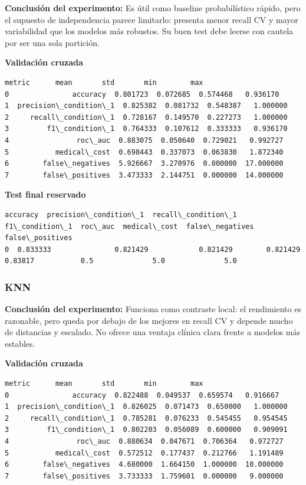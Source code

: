 \documentclass[11pt]{article}
\begin{document}
    
    \textbf{Conclusión del experimento:} Es útil como baseline
probabilístico rápido, pero el supuesto de independencia parece
limitarlo: presenta menor recall CV y mayor variabilidad que los modelos
más robustos. Su buen test debe leerse con cautela por ser una sola
partición.

    
    \textbf{Validación cruzada}

    
    
    \begin{Verbatim}[commandchars=\\\{\}]
                  metric      mean       std       min        max
0               accuracy  0.801723  0.072685  0.574468   0.936170
1  precision\_condition\_1  0.825382  0.081732  0.548387   1.000000
2     recall\_condition\_1  0.728167  0.149570  0.227273   1.000000
3         f1\_condition\_1  0.764333  0.107612  0.333333   0.936170
4                roc\_auc  0.883075  0.050640  0.729021   0.992727
5           medical\_cost  0.698443  0.337073  0.063830   1.872340
6        false\_negatives  5.926667  3.270976  0.000000  17.000000
7        false\_positives  3.473333  2.144751  0.000000  14.000000
    \end{Verbatim}

    
    \textbf{Test final reservado}

    
    
    \begin{Verbatim}[commandchars=\\\{\}]
   accuracy  precision\_condition\_1  recall\_condition\_1  f1\_condition\_1  roc\_auc  medical\_cost  false\_negatives  false\_positives
0  0.833333               0.821429            0.821429        0.821429  0.83817           0.5              5.0              5.0
    \end{Verbatim}

    
    \subsubsection{KNN}\label{knn}

    
    \textbf{Conclusión del experimento:} Funciona como contraste local: el
rendimiento es razonable, pero queda por debajo de los mejores en recall
CV y depende mucho de distancias y escalado. No ofrece una ventaja
clínica clara frente a modelos más estables.

    
    \textbf{Validación cruzada}

    
    
    \begin{Verbatim}[commandchars=\\\{\}]
                  metric      mean       std       min        max
0               accuracy  0.822488  0.049537  0.659574   0.916667
1  precision\_condition\_1  0.826025  0.071473  0.650000   1.000000
2     recall\_condition\_1  0.785281  0.076233  0.545455   0.954545
3         f1\_condition\_1  0.802203  0.056089  0.600000   0.909091
4                roc\_auc  0.880634  0.047671  0.706364   0.972727
5           medical\_cost  0.572512  0.177437  0.212766   1.191489
6        false\_negatives  4.680000  1.664150  1.000000  10.000000
7        false\_positives  3.733333  1.759601  0.000000   9.000000
    \end{Verbatim}
\end{document}
